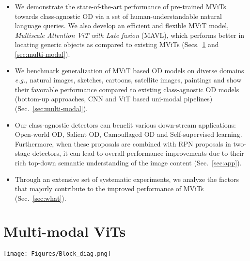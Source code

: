 \documentclass[runningheads]{llncs}
\def\eg{\emph{e.g.,}\xspace} \def\Eg{\emph{E.g.}\xspace}
\begin{document}
\begin{itemize}
    \item We demonstrate the state-of-the-art performance of pre-trained MViTs \cite{mdetr,gpv1} towards class-agnostic OD via a set of human-understandable natural language queries. We also develop an efficient and flexible MViT model, \emph{Multiscale Attention ViT with Late fusion} (MAVL), which performs better in locating generic objects as compared to existing MViTs (Secs.~\ref{sec:mdef} and \ref{sec:multi-modal}).
    \item We benchmark
generalization of MViT based OD models on diverse domains \eg natural images, sketches, cartoons, satellite images, paintings and show their favorable performance compared to existing class-agnostic OD models (bottom-up approaches, CNN and ViT based uni-modal pipelines) (Sec.~\ref{sec:multi-modal}).
    \item  Our class-agnostic detectors can benefit various down-stream applications: Open-world OD, Salient OD, Camouflaged OD and Self-supervised learning. Furthermore, when these proposals are combined with RPN proposals in two-stage detectors, it can lead to overall performance improvements due to their rich top-down semantic understanding of the image content (Sec.~\ref{sec:app}).
    \item Through an extensive set of systematic experiments, we analyze the factors that majorly contribute to the improved performance of MViTs (Sec.~\ref{sec:what}).
\end{itemize}

\section{Multi-modal ViTs}\label{sec:mdef}

\begin{figure*}[!t]
\centering
{\texttt{[image: Figures/Block\_diag.png]}}
\caption{\small Architecture overview of MViTs used in this work -- GPV-1 \cite{gpv1}, MDETR \cite{mdetr} and MAVL (ours). GPV-1 takes image along with a task description as input and outputs relevant region boxes and text. MDETR uses soft token prediction and contrastive alignment in latent space for cross-conceptualization using aligned image-text pairs. MAVL utilizes multi-scale image features with multi-scale deformable attention module (MSDA), and uses late-fusion strategy for vision-language fusion.}
\label{mvit_block_diagram}
\end{figure*}
\end{document}

